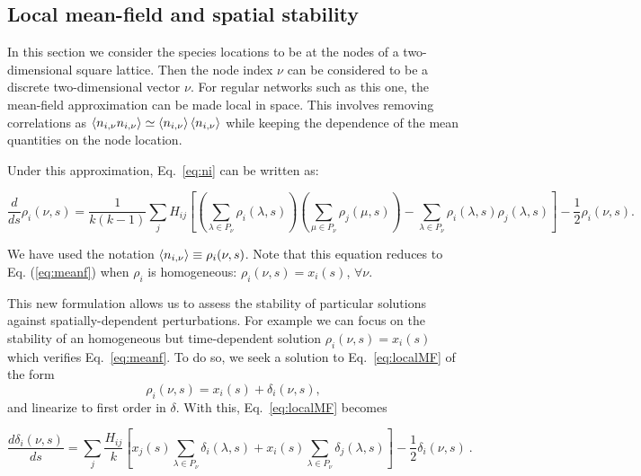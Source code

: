 \subsection{Local mean-field and spatial stability}
\label{sec:localmf}

In this section we consider the species locations to be at the
nodes of a two-dimensional square lattice. Then the node index
$\nu$ can be considered to be a discrete two-dimensional vector
$\nu$. For regular networks such as this one, the mean-field
approximation can be made local in space. This involves
removing correlations as
$\left\langle n_{i,\mathbf{\nu}}n_{i,\nu}\right\rangle\simeq\left\langle n_{i,\nu}\right\rangle\left\langle n_{i,\nu}\right\rangle$
while keeping the dependence of the mean quantities on the node
location.

Under this approximation, Eq.~\eqref{eq:ni} can be written as:

\begin{dmath}
 \frac{d}{ds}\rho_i(\nu,s) =  \frac{1}{k(k-1)} \sum_{j} H_{ij}  \left[
  \left(\sum_{\lambda\in P_\nu}\rho_i(\lambda,s)\right) \left(\sum_{\mu\in P_\nu}\rho_j(\mu,s)\right)
  - \sum_{\lambda \in P_\nu} \rho_i(\lambda,s) \rho_j(\lambda,s)
  \right]   -\frac{1}{2}\rho_i(\nu,s).
\label{eq:localMF}
\end{dmath}

We have used the notation $\left\langle n_{i,\nu}\right\rangle \equiv
\rho_i(\nu,s)$. Note that this equation reduces to Eq.
(\ref{eq:meanf}) when $\rho_i$ is homogeneous:
$\rho_i(\nu,s)=x_i(s)$, $\forall \nu$.

This new formulation allows us to assess the stability of
particular solutions against spatially-dependent perturbations.
For example we can focus on the stability of an homogeneous but
time-dependent solution $\rho_i(\nu,s)=x_i(s)$ which verifies
Eq.~\eqref{eq:meanf}. To do so, we seek a solution to
Eq.~\eqref{eq:localMF} of the form
\begin{equation}
  \rho_i(\nu,s)=x_i(s)+\delta_i(\nu,s),
\end{equation}
and linearize to first order in $\delta$. With this,
Eq.~\eqref{eq:localMF} becomes


\begin{dmath}
\frac{d\delta_i(\nu,s)}{ds} = \sum_j \frac{H_{ij}}{k}
\left[ x_j(s) \sum_{\lambda\in P_\nu} \delta_i(\lambda,s)
+  x_i(s) \sum_{\lambda\in P_\nu} \delta_j(\lambda,s)\right]  -\frac12 \delta_i(\nu,s)  \ .
\label{eq:localMFlin}
\end{dmath}

